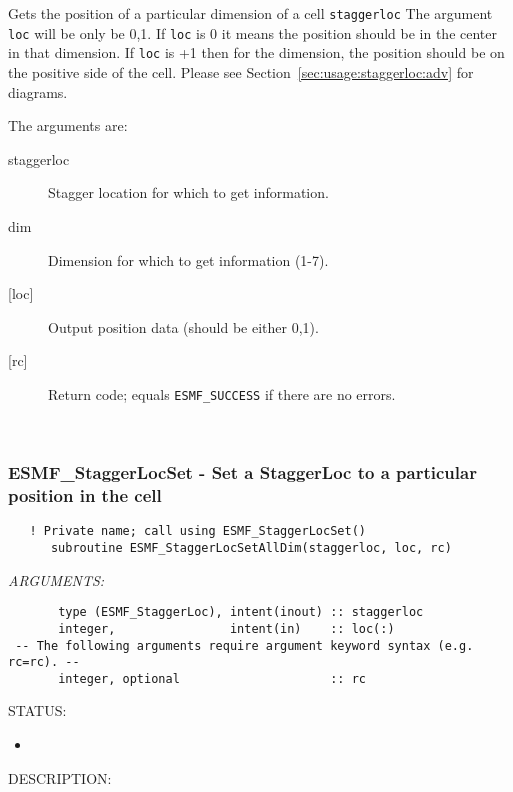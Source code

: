      Gets the position of a particular dimension of a cell {\tt staggerloc}
     The argument {\tt loc} will be only be 0,1. 
      If {\tt loc} is 0 it means the position 
      should be in the center in that dimension. If {\tt loc} is +1 then
      for the dimension, the position should be on the positive side of the cell. 
      Please see Section~\ref{sec:usage:staggerloc:adv} for diagrams.
  
       The arguments are:
       \begin{description}
       \item[staggerloc]
            Stagger location for which to get information. 
       \item[dim]
            Dimension for which to get information (1-7).
       \item[{[loc]}]
            Output position data (should be either 0,1).
       \item[{[rc]}]
            Return code; equals {\tt ESMF\_SUCCESS} if there are no errors.
     \end{description}
   
 
\mbox{}\hrulefill\ 
 
\subsubsection [ESMF\_StaggerLocSet] {ESMF\_StaggerLocSet - Set a StaggerLoc to a particular position in the cell}


 
\begin{verbatim}   ! Private name; call using ESMF_StaggerLocSet() 
      subroutine ESMF_StaggerLocSetAllDim(staggerloc, loc, rc)\end{verbatim}{\em ARGUMENTS:}
\begin{verbatim}       type (ESMF_StaggerLoc), intent(inout) :: staggerloc
       integer,                intent(in)    :: loc(:)
 -- The following arguments require argument keyword syntax (e.g. rc=rc). --
       integer, optional                     :: rc 
 \end{verbatim}
{\sf STATUS:}
   \begin{itemize}
   \item{}
   \end{itemize}
  
{\sf DESCRIPTION:\\ }


